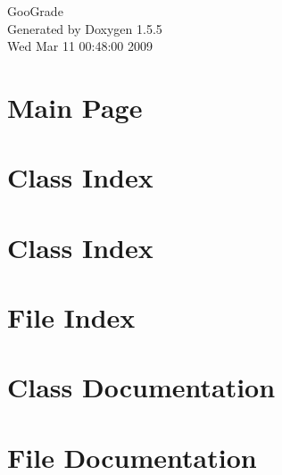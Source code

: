 \documentclass[a4paper]{book}
\begin{document}
\begin{titlepage}
\vspace*{7cm}
\begin{center}
{\Large GooGrade }\\
\vspace*{1cm}
{\large Generated by Doxygen 1.5.5}\\
\vspace*{0.5cm}
{\small Wed Mar 11 00:48:00 2009}\\
\end{center}
\end{titlepage}
\clearemptydoublepage
{}
\tableofcontents
\clearemptydoublepage
{}
\chapter{Main Page}
\label{index}\hypertarget{index}{}
\chapter{Class Index}

\chapter{Class Index}

\chapter{File Index}

\chapter{Class Documentation}
















\chapter{File Documentation}


































\printindex
\end{document}
